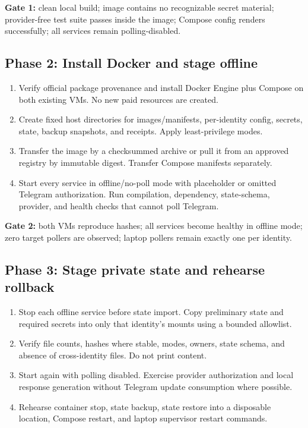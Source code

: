 \documentclass[11pt]{article}
\begin{document}
\textbf{Gate 1:} clean local build; image contains no recognizable secret
material; provider-free test suite passes inside the image; Compose config
renders successfully; all services remain polling-disabled.

\subsection*{Phase 2: Install Docker and stage offline}
\begin{enumerate}
\item Verify official package provenance and install Docker Engine plus Compose
on both existing VMs. No new paid resources are created.
\item Create fixed host directories for images/manifests, per-identity config,
secrets, state, backup snapshots, and receipts. Apply least-privilege modes.
\item Transfer the image by a checksummed archive or pull it from an approved
registry by immutable digest. Transfer Compose manifests separately.
\item Start every service in offline/no-poll mode with placeholder or omitted
Telegram authorization. Run compilation, dependency, state-schema, provider,
and health checks that cannot poll Telegram.
\end{enumerate}

\textbf{Gate 2:} both VMs reproduce hashes; all services become healthy in
offline mode; zero target pollers are observed; laptop pollers remain exactly
one per identity.

\subsection*{Phase 3: Stage private state and rehearse rollback}
\begin{enumerate}
\item Stop each offline service before state import. Copy preliminary state and
required secrets into only that identity's mounts using a bounded allowlist.
\item Verify file counts, hashes where stable, modes, owners, state schema, and
absence of cross-identity files. Do not print content.
\item Start again with polling disabled. Exercise provider authorization and
local response generation without Telegram update consumption where possible.
\item Rehearse container stop, state backup, state restore into a disposable
location, Compose restart, and laptop supervisor restart commands.
\end{enumerate}
\end{document}
